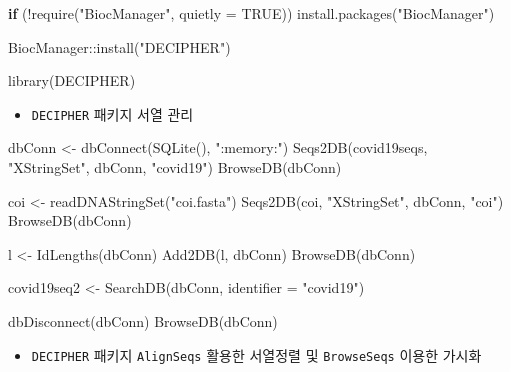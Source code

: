 \documentclass[
]{book}
\newenvironment{Shaded}{\begin{snugshade}}{\end{snugshade}}
\newcommand{\AttributeTok}[1]{\textcolor[rgb]{0.77,0.63,0.00}{#1}}
\newcommand{\ConstantTok}[1]{\textcolor[rgb]{0.00,0.00,0.00}{#1}}
\newcommand{\ControlFlowTok}[1]{\textcolor[rgb]{0.13,0.29,0.53}{\textbf{#1}}}
\newcommand{\FunctionTok}[1]{\textcolor[rgb]{0.00,0.00,0.00}{#1}}
\newcommand{\NormalTok}[1]{#1}
\newcommand{\OtherTok}[1]{\textcolor[rgb]{0.56,0.35,0.01}{#1}}
\newcommand{\SpecialCharTok}[1]{\textcolor[rgb]{0.00,0.00,0.00}{#1}}
\newcommand{\StringTok}[1]{\textcolor[rgb]{0.31,0.60,0.02}{#1}}
\providecommand{\tightlist}{%
  \setlength{\itemsep}{0pt}\setlength{\parskip}{0pt}}
\begin{document}
\begin{Shaded}
\begin{Highlighting}[]

\ControlFlowTok{if}\NormalTok{ (}\SpecialCharTok{!}\FunctionTok{require}\NormalTok{(}\StringTok{"BiocManager"}\NormalTok{, }\AttributeTok{quietly =} \ConstantTok{TRUE}\NormalTok{))}
    \FunctionTok{install.packages}\NormalTok{(}\StringTok{"BiocManager"}\NormalTok{)}

\NormalTok{BiocManager}\SpecialCharTok{::}\FunctionTok{install}\NormalTok{(}\StringTok{"DECIPHER"}\NormalTok{)}

\FunctionTok{library}\NormalTok{(DECIPHER)}
\end{Highlighting}
\end{Shaded}

\begin{itemize}
\tightlist
\item
  \texttt{DECIPHER} 패키지 서열 관리
\end{itemize}

\begin{Shaded}
\begin{Highlighting}[]

\NormalTok{dbConn }\OtherTok{\textless{}{-}} \FunctionTok{dbConnect}\NormalTok{(}\FunctionTok{SQLite}\NormalTok{(), }\StringTok{":memory:"}\NormalTok{)}
\FunctionTok{Seqs2DB}\NormalTok{(covid19seqs, }\StringTok{"XStringSet"}\NormalTok{, dbConn, }\StringTok{"covid19"}\NormalTok{)}
\FunctionTok{BrowseDB}\NormalTok{(dbConn)}

\NormalTok{coi }\OtherTok{\textless{}{-}} \FunctionTok{readDNAStringSet}\NormalTok{(}\StringTok{"coi.fasta"}\NormalTok{)}
\FunctionTok{Seqs2DB}\NormalTok{(coi, }\StringTok{"XStringSet"}\NormalTok{, dbConn, }\StringTok{"coi"}\NormalTok{)}
\FunctionTok{BrowseDB}\NormalTok{(dbConn)}

\NormalTok{l }\OtherTok{\textless{}{-}} \FunctionTok{IdLengths}\NormalTok{(dbConn)}
\FunctionTok{Add2DB}\NormalTok{(l, dbConn)}
\FunctionTok{BrowseDB}\NormalTok{(dbConn)}

\NormalTok{covid19seq2 }\OtherTok{\textless{}{-}} \FunctionTok{SearchDB}\NormalTok{(dbConn, }\AttributeTok{identifier =} \StringTok{"covid19"}\NormalTok{)}

\FunctionTok{dbDisconnect}\NormalTok{(dbConn)}
\FunctionTok{BrowseDB}\NormalTok{(dbConn)}
\end{Highlighting}
\end{Shaded}

\begin{itemize}
\tightlist
\item
  \texttt{DECIPHER} 패키지 \texttt{AlignSeqs} 활용한 서열정렬 및 \texttt{BrowseSeqs} 이용한 가시화
\end{itemize}
\end{document}
